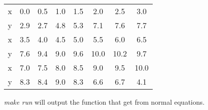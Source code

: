 \documentclass[a4paper]{book}
\numberwithin{equation}{chapter}
\theoremstyle{definition}
\begin{document}
\begin{tabular}{c | c c c c c c c}
  \toprule 
  x & 0.0 & 0.5 & 1.0 & 1.5 & 2.0 & 2.5 & 3.0 \\
  y & 2.9 & 2.7 & 4.8 & 5.3 & 7.1 & 7.6 & 7.7 \\
  \midrule 
  x & 3.5 & 4.0 & 4.5 & 5.0 & 5.5 & 6.0 & 6.5 \\
  y & 7.6 & 9.4 & 9.0 & 9.6 & 10.0 & 10.2 & 9.7 \\
  \midrule 
  x & 7.0 & 7.5 & 8.0 & 8.5 & 9.0 & 9.5 & 10.0 \\
  y & 8.3 & 8.4 & 9.0 & 8.3 & 6.6 & 6.7 & 4.1 \\
  \bottomrule
\end{tabular}

\textit{make run} will output the function that get from normal equations.









%   

%   

%   


\end{document}
